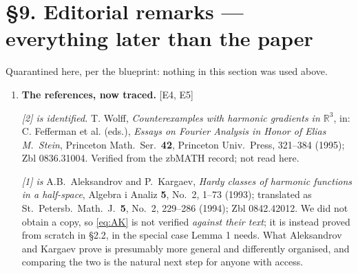 \documentclass[11pt,reqno]{amsart}
\theoremstyle{plain}
\theoremstyle{definition}
\theoremstyle{plain}
\theoremstyle{definition}
\theoremstyle{remark}
\newcommand{\Ledger}[1]{{\scriptsize\textsf{[#1]}}}
\begin{document}
\section*{\S9. Editorial remarks --- everything later than the paper}

Quarantined here, per the blueprint: nothing in this section was used above.

\begin{enumerate}[leftmargin=1.6em,itemsep=4pt]
\item \textbf{The references, now traced.} \Ledger{E4, E5}

  \emph{[2] is identified.} T. Wolff, \emph{Counterexamples with harmonic gradients
  in $\mathbb{R}^3$}, in: C. Fefferman et al. (eds.), \emph{Essays on Fourier
  Analysis in Honor of Elias M.\ Stein}, Princeton Math.\ Ser.\ \textbf{42},
  Princeton Univ.\ Press, 321--384 (1995); Zbl 0836.31004. Verified from the zbMATH
  record; not read here.

  \emph{[1] is} A.B.~Aleksandrov and P.~Kargaev, \emph{Hardy classes of harmonic
  functions in a half-space}, Algebra i Analiz \textbf{5}, No.~2, 1--73 (1993);
  translated as St.\ Petersb.\ Math.\ J.\ \textbf{5}, No.~2, 229--286 (1994);
  Zbl 0842.42012. We did not obtain a copy, so \eqref{eq:AK} is not verified
  \emph{against their text}; it is instead proved from scratch in \S2.2, in the
  special case Lemma 1 needs. What Aleksandrov and Kargaev prove is presumably more
  general and differently organised, and comparing the two is the natural next step
  for anyone with access.


\end{enumerate}
\end{document}
